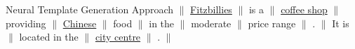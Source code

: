 \begin{frame}{Neural Template Generation Approach}
$\|$ \underline{Fitzbillies} $\|$  \pause is a $\|$ \pause   \underline{coffee shop} $\|$ \pause  providing $\|$  \underline{Chinese} $\|$ food $\|$ in the $\|$  moderate $\|$ price range $\|$ . $\|$ It is  $\|$ located in the $\|$ \underline{city centre} $\|$ . $\|$





\end{frame}















